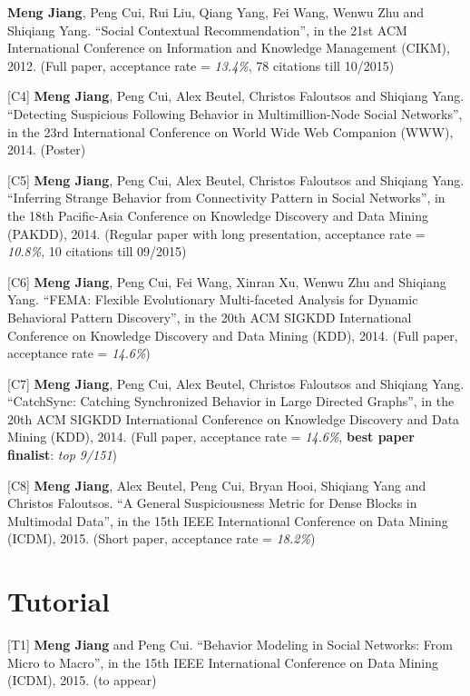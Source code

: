 \documentclass[margin, 10pt]{res} %
\begin{document}
\begin{resume}
[C3] {\bf Meng Jiang}, Peng Cui, Rui Liu, Qiang Yang, Fei Wang, Wenwu Zhu and Shiqiang Yang. ``Social Contextual Recommendation'', in the 21st ACM International Conference on Information and Knowledge Management (CIKM), 2012. (Full paper, acceptance rate = {\em 13.4\%}, 78 citations till 10/2015)

[C4] {\bf Meng Jiang}, Peng Cui, Alex Beutel, Christos Faloutsos and Shiqiang Yang. ``Detecting Suspicious Following Behavior in Multimillion-Node Social Networks'', in the 23rd International Conference on World Wide Web Companion (WWW), 2014. (Poster)

[C5] {\bf Meng Jiang}, Peng Cui, Alex Beutel, Christos Faloutsos and Shiqiang Yang. ``Inferring Strange Behavior from Connectivity Pattern in Social Networks'', in the 18th Pacific-Asia Conference on Knowledge Discovery and Data Mining (PAKDD), 2014. (Regular paper with long presentation, acceptance rate = {\em 10.8\%}, 10 citations till 09/2015)

[C6] {\bf Meng Jiang}, Peng Cui, Fei Wang, Xinran Xu, Wenwu Zhu and Shiqiang Yang. ``FEMA: Flexible Evolutionary Multi-faceted Analysis for Dynamic Behavioral Pattern Discovery'', in the 20th ACM SIGKDD International Conference on Knowledge Discovery and Data Mining (KDD), 2014. (Full paper, acceptance rate = {\em 14.6\%})

[C7] {\bf Meng Jiang}, Peng Cui, Alex Beutel, Christos Faloutsos and Shiqiang Yang. ``CatchSync: Catching Synchronized Behavior in Large Directed Graphs'', in the 20th ACM SIGKDD International Conference on Knowledge Discovery and Data Mining (KDD), 2014. (Full paper, acceptance rate = {\em 14.6\%}, {\bf best paper finalist}: {\em top 9/151})

[C8] {\bf Meng Jiang}, Alex Beutel, Peng Cui, Bryan Hooi, Shiqiang Yang and Christos Faloutsos. ``A General Suspiciousness Metric for Dense Blocks in Multimodal Data'', in the 15th IEEE International Conference on Data Mining (ICDM), 2015. (Short paper, acceptance rate = {\em 18.2\%})


\section{Tutorial}

[T1] {\bf Meng Jiang} and Peng Cui. ``Behavior Modeling in Social Networks: From Micro to Macro'', in the 15th IEEE International Conference on Data Mining (ICDM), 2015. (to appear)



\end{resume}
\end{document}
